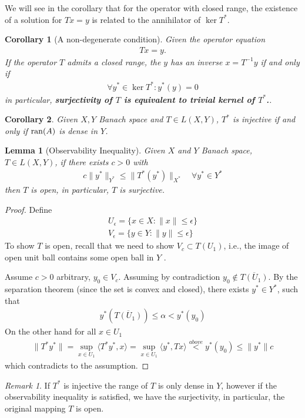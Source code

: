 \documentclass[a4paper,11pt,fleqn]{book}
\newtheorem{corollary}{Corollary}[theorem]
\newtheorem{lemma}[theorem]{Lemma}
\theoremstyle{definition}
\theoremstyle{remark}
\newtheorem*{remark}{Remark}
\begin{document}
We will see in the corollary that for the operator with closed range, the existence of a solution for $Tx = y$ is related to the annihilator of $\ker T^*$.
\begin{corollary}[A non-degenerate condition]
Given the operator equation
\begin{align*}
	Tx = y.
\end{align*}
If the operator $T$ admits a closed range, the $y$ has an inverse $x = T^{-1}y$ if and only if
	\begin{align*}
		\forall y^* \in \ker T^* : y^*(y) = 0
	\end{align*}
	in particular, \textbf{surjectivity of $T$ is equivalent to trivial kernel of $T^*$.}. 
\end{corollary}

\begin{corollary}
	Given $X, Y$ Banach space and $T \in L(X, Y)$, $T^*$ is injective if and only if  $\operatorname{ran}(A)$ is dense in $Y$.
\end{corollary}

\begin{lemma}[Observability Inequality]
	Given $X$ and $Y$ Banach space, $T\in L(X,Y)$, if there exists $c > 0$ with 
	\begin{align*}
		c\|y^*\|_{Y^*} \le \|T^*(y^*)\|_{X^*} \quad \forall y^* \in Y^*
	\end{align*}
	then $T$ is open, in particular, $T$ is surjective. 
\end{lemma}
\begin{proof}
Define
\begin{align*}
	U_\epsilon = \{x \in X: \|x\| \le \epsilon \}\\
	V_\epsilon = \{y \in Y: \|y\| \le \epsilon \}
\end{align*}
	To show $T$ is open, recall that we need to show $V_c \subset T(U_1)$, i.e., the image of open unit ball contains some open ball in $Y$ .\par 
	Assume $c >0$ arbitrary, $y_0 \in V_c$. Assuming by contradiction $y_0 \notin \overline{T(U_1)}$. By the separation theorem (since the set is convex and closed),  there exists $y^* \in Y^*$, such that
	\begin{align*}
		y^*(\overline{T(U_1)}) \le \alpha < y^*(y_0)
	\end{align*}
	On the other hand for all $x \in U_1$ 
	\begin{align*}
		\|T^*y^*\| = \sup_{x \in U_1} \langle T^*y^*, x\rangle = \sup_{x \in U_1} \langle y^*, Tx\rangle  \overset{above}{< } y^*(y_0) \le \|y^*\|c
	\end{align*}
	which contradicts to the assumption.
\end{proof}
\begin{remark}
If $T^*$ is injective the range of $T$ is only dense in $Y$, however if the observability inequality is satisfied, we have the surjectivity, in particular, the original mapping $T$ is open. 	
\end{remark}
\end{document}
